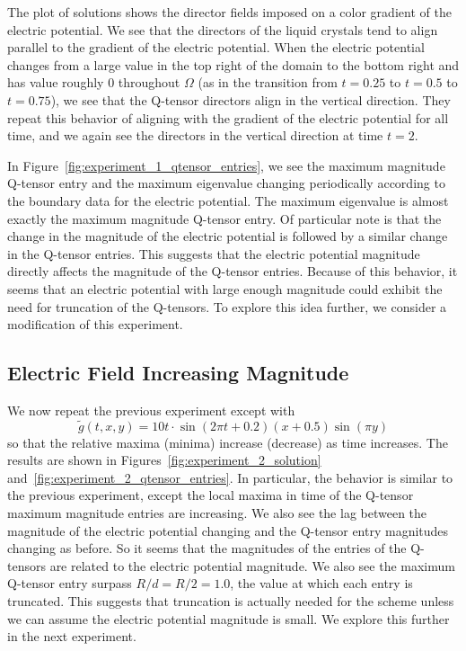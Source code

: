 \documentclass[10pt,letterpaper]{amsart}
\theoremstyle{definition}{\newtheorem{definition}[lemma]{Definition}}
\theoremstyle{note}{\newtheorem{claim}{Claim}[section]
\newtheorem*{claim*}{Claim}}
\numberwithin{equation}{section}
\begin{document}
The plot of solutions shows the director fields imposed on a color gradient of the electric potential. We see that the directors of the liquid crystals tend to align parallel to the gradient of the electric potential. When the electric potential changes from a large value in the top right of the domain to the bottom right and has value roughly $0$ throughout $\Omega$ (as in the transition from $t=0.25$ to $t=0.5$ to $t=0.75$), we see that the Q-tensor directors align in the vertical direction. They repeat this behavior of aligning with the gradient of the electric potential for all time, and we again see the directors in the vertical direction at time $t=2$. 

In Figure~\ref{fig:experiment_1_qtensor_entries}, we see the maximum magnitude Q-tensor entry and the maximum eigenvalue changing periodically according to the boundary data for the electric potential. The maximum eigenvalue is almost exactly the maximum magnitude Q-tensor entry. Of particular note is that the change in the magnitude of the electric potential is followed by a similar change in the Q-tensor entries. This suggests that the electric potential magnitude directly affects the magnitude of the Q-tensor entries. Because of this behavior, it seems that an electric potential with large enough magnitude could exhibit the need for truncation of the Q-tensors. To explore this idea further, we consider a modification of this experiment.

\subsection{Electric Field Increasing Magnitude}\label{sec:increasing-magnitude}
We now repeat the previous experiment except with 
\[
    \tilde g(t, x, y) = 10t\cdot\sin(2\pi t + 0.2)(x+0.5)\sin(\pi y)
\]
so that the relative maxima (minima) increase (decrease) as time increases. The results are shown in Figures~\ref{fig:experiment_2_solution} and~\ref{fig:experiment_2_qtensor_entries}. In particular, the behavior is similar to the previous experiment, except the local maxima in time of the Q-tensor maximum magnitude entries are increasing. We also see the lag between the magnitude of the electric potential changing and the Q-tensor entry magnitudes changing as before. So it seems that the magnitudes of the entries of the Q-tensors are related to the electric potential magnitude. We also see the maximum Q-tensor entry surpass $R/d = R/2 = 1.0$, the value at which each entry is truncated. This suggests that truncation is actually needed for the scheme unless we can assume the electric potential magnitude is small. We explore this further in the next experiment.
\end{document}
